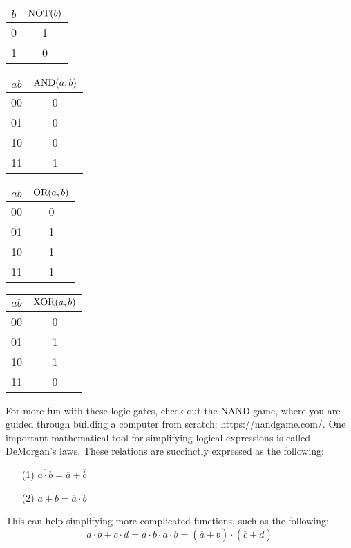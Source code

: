 \documentclass{article}
\newcommand{\NOT}{\ensuremath\text{NOT}}
\newcommand{\AND}{\ensuremath\text{AND}}
\newcommand{\OR}{\ensuremath\text{OR}}
\newcommand{\XOR}{\ensuremath\text{XOR}}
\begin{document}
\begin{table}[hbt!]
    \centering
    \begin{minipage}{.2\linewidth}
    \begin{tabular}{c|c}
         $b$ & $\NOT(b)$ \\
         \hline
         0 & 1 \\
         1 & 0 \\
    \end{tabular}
    \end{minipage}
        \begin{minipage}{.2\linewidth}
    \begin{tabular}{c|c}
         $ab$ & $\AND(a,b)$ \\
         \hline
         00 & 0\\
         01 & 0 \\
         10 & 0\\
         11 & 1 \\
    \end{tabular}
    \end{minipage}
            \begin{minipage}{.2\linewidth}
    \begin{tabular}{c|c}
         $ab$ & $\OR(a,b)$ \\
         \hline
         00 & 0\\
         01 & 1 \\
         10 & 1\\
         11 & 1 \\
    \end{tabular}
    \end{minipage}
    \begin{minipage}{.2\linewidth}
    \begin{tabular}{c|c}
         $ab$ & $\XOR(a,b)$ \\
         \hline
         00 & 0\\
         01 & 1 \\
         10 & 1\\
         11 & 0 \\
    \end{tabular}
    \end{minipage}
\end{table}
For more fun with these logic gates, check out the NAND game, where you are guided through building a computer from scratch: https://nandgame.com/. One important mathematical tool for simplifying logical expressions is called DeMorgan's laws. These relations are succinctly expressed as the following:
\begin{itemize}
\centering
    \item[(1)] $\overline{a\cdot b} = \overline{a} + \overline{b}$
    \item[(2)] $\overline{a + b} = \overline{a} \cdot \overline{b}$
\end{itemize}
This can help simplifying more complicated functions, such as the following:
$$
\overline{a\cdot b + c \cdot d} = \overline{a\cdot b}\cdot \overline{a \cdot b} = (\overline a + \overline b)\cdot (\overline c + \overline d)
$$
\end{document}

